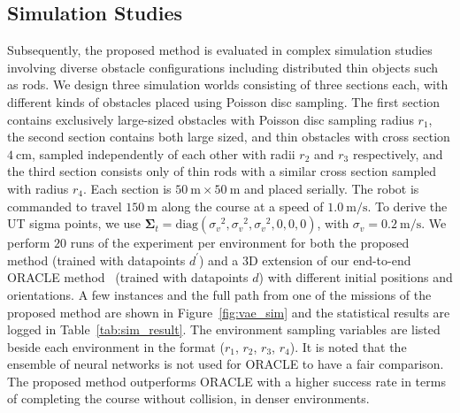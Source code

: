 \subsection{Simulation Studies}\label{sec:sim_studies}
Subsequently, the proposed method is evaluated in complex simulation studies involving diverse obstacle configurations including distributed thin objects such as rods. We design three simulation worlds consisting of three sections each, with different kinds of obstacles placed using Poisson disc sampling. The first section contains exclusively large-sized obstacles with Poisson disc sampling radius $r_1$, the second section contains both large sized, and thin obstacles with cross section $4~\textrm{cm}$, sampled independently of each other with radii $r_2$ and $r_3$ respectively, and the third section consists only of thin rods with a similar cross section sampled with radius $r_4$. Each section is $50~\textrm{m}\times50~\textrm{m}$ and placed serially. The robot is commanded to travel $150~\textrm{m}$ along the course at a speed of $1.0~\textrm{m/s}$. To derive the UT sigma points, we use $\boldsymbol{\Sigma}_t = \textrm{diag}({\sigma_v}^2, {\sigma_v}^2, {\sigma_v}^2, 0, 0, 0)$, with ${\sigma_v}=0.2~\textrm{m}/\textrm{s}$. We perform $20$ runs of the experiment per environment for both the proposed method (trained with datapoints $d^\prime$) and a $3$D extension of our end-to-end ORACLE method~\cite{ORACLE_ICRA2022} (trained with datapoints $d$) with different initial positions and orientations. A few instances and the full path from one of the missions of the proposed method are shown in Figure~\ref{fig:vae_sim} and the statistical results are logged in Table~\ref{tab:sim_result}. The environment sampling variables are listed beside each environment in the format ($r_1$, $r_2$, $r_3$, $r_4$). It is noted that the ensemble of neural networks is not used for ORACLE to have a fair comparison. 
The proposed method outperforms ORACLE with a higher success rate in terms of completing the course without collision, in denser environments.



